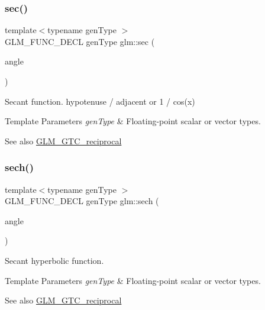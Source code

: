 \subsubsection{\texorpdfstring{sec()}{sec()}}
{\footnotesize\ttfamily template$<$typename gen\+Type $>$ \\
G\+L\+M\+\_\+\+F\+U\+N\+C\+\_\+\+D\+E\+CL gen\+Type glm\+::sec (\begin{DoxyParamCaption}\item[{gen\+Type}]{angle }\end{DoxyParamCaption})}

Secant function. hypotenuse / adjacent or 1 / cos(x)


\begin{DoxyTemplParams}{Template Parameters}
{\em gen\+Type} & Floating-\/point scalar or vector types.\\
\hline
\end{DoxyTemplParams}
\begin{DoxySeeAlso}{See also}
\hyperlink{group__gtc__reciprocal}{G\+L\+M\+\_\+\+G\+T\+C\+\_\+reciprocal} 
\end{DoxySeeAlso}
\mbox{\label{group__gtc__reciprocal_ga9a5cfd1e7170104a7b33863b1b75e5ae}} 
\subsubsection{\texorpdfstring{sech()}{sech()}}
{\footnotesize\ttfamily template$<$typename gen\+Type $>$ \\
G\+L\+M\+\_\+\+F\+U\+N\+C\+\_\+\+D\+E\+CL gen\+Type glm\+::sech (\begin{DoxyParamCaption}\item[{gen\+Type}]{angle }\end{DoxyParamCaption})}

Secant hyperbolic function.


\begin{DoxyTemplParams}{Template Parameters}
{\em gen\+Type} & Floating-\/point scalar or vector types.\\
\hline
\end{DoxyTemplParams}
\begin{DoxySeeAlso}{See also}
\hyperlink{group__gtc__reciprocal}{G\+L\+M\+\_\+\+G\+T\+C\+\_\+reciprocal} 
\end{DoxySeeAlso}
